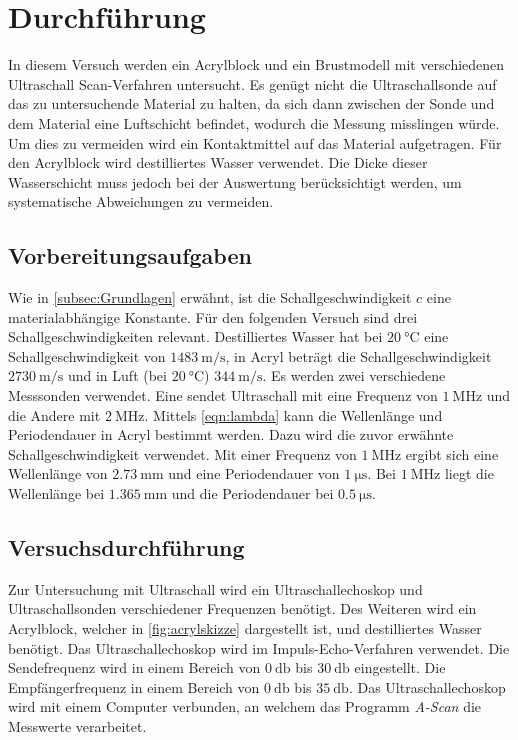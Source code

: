 \section{Durchführung}
\label{sec:Durchführung}
In diesem Versuch werden ein Acrylblock und ein Brustmodell mit verschiedenen Ultraschall Scan-Verfahren untersucht. Es genügt nicht die Ultraschallsonde auf das zu untersuchende Material zu halten, da sich dann
zwischen der Sonde und dem Material eine Luftschicht befindet, wodurch die Messung misslingen würde. Um dies zu vermeiden
wird ein Kontaktmittel auf das Material aufgetragen. Für den Acrylblock wird destilliertes Wasser verwendet.
Die Dicke dieser Wasserschicht muss jedoch bei der Auswertung berücksichtigt werden, um systematische Abweichungen zu vermeiden.

\subsection{Vorbereitungsaufgaben}
\label{subsec:VBA}
Wie in \autoref{subsec:Grundlagen} erwähnt, ist die Schallgeschwindigkeit $c$ eine materialabhängige Konstante. Für den folgenden Versuch sind drei 
Schallgeschwindigkeiten relevant. Destilliertes Wasser hat bei $\qty{20}{\celsius}$ eine Schallgeschwindigkeit von $\qty{1483}{\metre\per\second}$,
in Acryl beträgt die Schallgeschwindigkeit $\qty{2730}{\metre\per\second}$ und in Luft (bei $\qty{20}{\celsius}$) $\qty{344}{\metre\per\second}$.
Es werden zwei verschiedene Messsonden verwendet. Eine sendet Ultraschall mit eine Frequenz von $\qty{1}{\mega\hertz}$ und die Andere mit $\qty{2}{\mega\hertz}$. 
Mittels \autoref{eqn:lambda} kann die Wellenlänge und Periodendauer in Acryl bestimmt werden. Dazu wird die zuvor erwähnte Schallgeschwindigkeit
verwendet. Mit einer Frequenz von $\qty{1}{\mega\hertz}$ ergibt sich eine Wellenlänge von $\qty{2.73}{\milli\metre}$ und eine Periodendauer von $\qty{1}{\micro\second}$. 
Bei $\qty{1}{\mega\hertz}$ liegt die Wellenlänge bei $\qty{1.365}{\milli\metre}$ und die Periodendauer bei $\qty{0.5}{\micro\second}$.
\subsection{Versuchsdurchführung}
\label{subsec:Versuchsdurchführung}
Zur Untersuchung mit Ultraschall wird ein Ultraschallechoskop und Ultraschallsonden verschiedener Frequenzen benötigt. Des Weiteren wird ein Acrylblock, welcher
in \autoref{fig:acrylskizze} dargestellt ist, und destilliertes Wasser benötigt. 
Das Ultraschallechoskop wird im Impuls-Echo-Verfahren verwendet. Die Sendefrequenz wird in einem Bereich von $\qty{0}{\decibel}$ bis $\qty{30}{\decibel}$ eingestellt. Die 
Empfängerfrequenz in einem Bereich von $\qty{0}{\decibel}$ bis $\qty{35}{\decibel}$. Das Ultraschallechoskop wird mit einem Computer verbunden, an welchem  
das Programm \textit{A-Scan} die Messwerte verarbeitet. 

